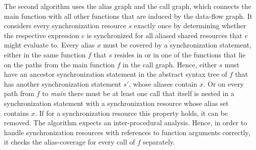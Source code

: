 The second algorithm uses the alias graph and the call graph, which connects the main function with all other functions that are induced by the data-flow graph. It considers every synchronization resource $s$ exactly once by determining whether the respective expression $e$ is synchronized for all aliased shared resources that $e$ might evaluate to. Every alias $x$ must  be covered by a synchronization statement, either in the same function $f$ that $s$ resides in or in one of the functions that lie on the paths from the main function $f$ in the call graph. Hence, either $s$ must have an ancestor synchronization statement in the abstract syntax tree of $f$ that has another synchronization statement $s'$, whose aliases contain $x$. Or on every path from $f$ to \textit{main} there must be at least one call that itself is nested in a synchronization statement with a synchronization resource whose alias set contains $x$. If for a synchronization resource this property holds, it can be removed. The algorithm expects an inter-procedural analysis. Hence, in order to handle synchronization resources with references to function arguments correctly, it checks the alias-coverage for every call of $f$ separately.

